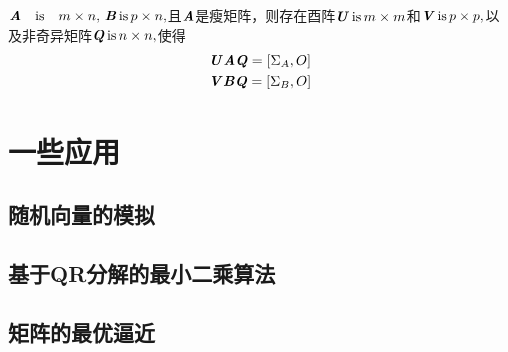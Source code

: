\begin{theorem}
    $\amn,\, \MB \,\text{is}\, p \times n,$且$\MA$是瘦矩阵，则存在酉阵$\MU \, \text{is} \, m \times m$和$\MV \, \text{is} \, p \times p,$以及非奇异矩阵$\MQ \, \text{is} \, n \times n,$使得
    \begin{gather}
        \MU\MA\MQ = \left[\Sigma_A, O\right]  \\
        \MV\MB\MQ = \left[\Sigma_B, O\right]
    \end{gather}
\end{theorem}

\section{一些应用}
\label{sec:一些应用}

\subsection{随机向量的模拟}
\label{sub:随机向量的模拟}

\subsection{基于QR分解的最小二乘算法}
\label{sub:基于QR分解的最小二乘算法}

\subsection{矩阵的最优逼近}
\label{sub:矩阵的最优逼近}


